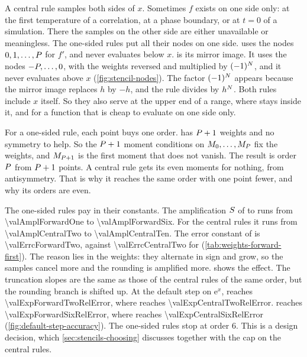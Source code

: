 A central rule samples both sides of $x$. Sometimes $f$ exists on one side only: at the first temperature of a
correlation, at a phase boundary, or at $t = 0$ of a simulation. There the samples on the other side are either
unavailable or meaningless. The one-sided rules put all their nodes on one side.  uses the nodes
$0, 1, \ldots, P$ for $f'$, and never evaluates below $x$.  is its mirror image. It uses the
nodes $-P, \ldots, 0$, with the weights reversed and multiplied by $(-1)^{N}$, and it never evaluates
above $x$ (\cref{fig:stencil-nodes}). The factor $(-1)^{N}$ appears because the mirror image replaces $h$ by
$-h$, and the rule divides by $h^{N}$. Both rules include $x$ itself. So they also serve at the upper end of a
range, where  stays inside it, and for a function that is cheap to evaluate on one side only.

\begin{marginfigure}
\centering

\caption{ against , and  against . The slopes
are the same; the floors are higher, because the one-sided rules have a larger $\ampl$.\label{fig:one-sided}}
\end{marginfigure}

For a one-sided rule, each point buys one order.  has $P + 1$ weights and no symmetry to
help. So the $P + 1$ moment conditions on $M_{0}, \ldots, M_{P}$ fix the weights, and
$M_{P + 1}$ is the first moment that does not vanish. The result is order $P$ from $P + 1$ points.
A central rule gets its even moments for nothing, from antisymmetry. That is why it reaches the same order with one
point fewer, and why its orders are even.

The one-sided rules pay in their constants. The amplification $\ampl$ of  to  runs
from \num{\valAmplForwardOne} to \num{\valAmplForwardSix}. For the central rules it runs from \num{\valAmplCentralTwo}
to \num{\valAmplCentralTen}. The error constant of  is \num{\valErrcForwardTwo}, against
\num{\valErrcCentralTwo} for  (\cref{tab:weights-forward-first}). The reason lies in the weights:
they alternate in sign and grow, so the samples cancel more and the rounding is amplified more. 
shows the effect. The truncation slopes are the same as those of the central rules of the same order, but the
rounding branch is shifted up. At the default step on $\mathrm{e}^x$,  reaches
\num{\valExpForwardTwoRelError}, where  reaches \num{\valExpCentralTwoRelError}. 
reaches \num{\valExpForwardSixRelError}, where  reaches \num{\valExpCentralSixRelError}
(\cref{fig:default-step-accuracy}). The one-sided rules stop at order 6. This is a design decision, which
\cref{sec:stencils-choosing} discusses together with the cap on the central rules.

